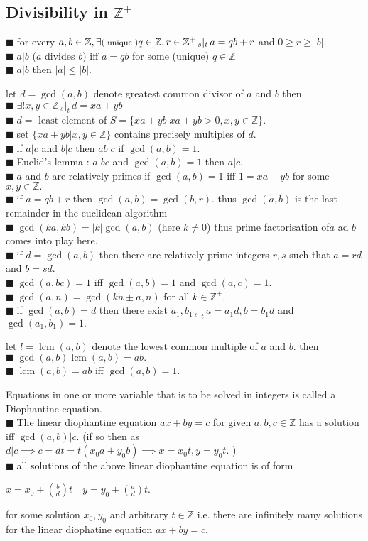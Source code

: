 \documentclass[11pt]{extarticle}
\newcommand{\Z}{\mathbb{Z}}
\newcommand{\snote}[1]{{\footnotesize(#1)}}
\newcommand{\st}{\,{}_{s}|_t\,}
\newcommand{\tbx}[2][]{
\begin{tcolorbox}[enhanced,breakable,size=small,colback=black!2!white,title={#1},arc is angular, arc=1.5mm,
	drop fuzzy shadow]
	#2
\end{tcolorbox}
}
\newcommand{\y}{$\blacksquare\;$}
\DeclareMathOperator{\lcm}{lcm}
\begin{document}
\begin{multicols}{2}
\section{Divisibility in $ \Z^+ $}
\tbx{ \y  for every $ a,b\in \Z, \exists \text{\snote{ unique }}q\in \Z, r\in \Z^+ \st a=qb+r$  and $ 0\geq r\geq |b|. $ \\
\y $ a|b $ \snote{$ a $ divides $ b $} iff $ a=qb $ for some \snote{unique} $ q\in \Z $ \\
\y $ a|b $ then $ |a| \leq |b|.$ }
\tbx{let $d= \gcd(a,b) $ denote greatest common divisor of $ a $ and $ b $ then\\
\y $ \exists! x,y\in \Z\st d=xa+yb$ \\
\y $ d=\text{ least element of } S=\{xa+yb|xa+yb>0,x,y\in \Z\} $. \\
\y set $ \{xa+yb|x,y\in \Z\} $ contains precisely multiples of $ d .$\\ 
\y if $ a|c $ and $ b|c $ then $ ab|c $ if $ \gcd(a,b)=1 $.\\
\y Euclid's lemma : $ a|bc $ and $ \gcd(a,b)=1 $ then $ a|c .$\\
\y $ a $ and $ b $ are relatively primes if $ \gcd(a,b)=1 $ iff $ 1=xa+yb $ for some $ x,y\in \Z. $ \\
\y if $ a=qb+r  $ then $ \gcd(a,b)=\gcd(b,r) .$ thus $ \gcd(a,b) $ is the last remainder in the euclidean algorithm\\
\y $ \gcd(ka,kb)=|k|\gcd(a,b) $ \snote{here $ k\neq0 $} thus prime factorisation of$ a $ ad $ b $ comes into play here.\\
\y if $ d=\gcd(a,b) $ then there are relatively prime integers $ r,s $ such that $ a=rd $ and $ b=sd. $ \\
\y $ \gcd(a,bc)=1 $ iff $ \gcd(a,b) =1$ and $ \gcd(a,c) =1.$ \\
\y $ \gcd(a,n)= \gcd(kn\pm a, n)$ for all $ k\in \Z^+ .$ \\
\y if $ \gcd(a,b)=d $ then there exist $ a_1,b_1\st a=a_1d,b=b_1d $ and $ \gcd(a_1,b_1)=1. $}
\tbx{ let $ l= \lcm(a,b)$ denote the lowest common multiple of $ a $ and $ b. $ then\\
 \y $ \gcd(a,b)\lcm(a,b)=ab. $ \\
 \y $ \lcm(a,b)=ab $ iff $ \gcd(a,b)=1. $  }
\tbx[ Diophantine equations]{  Equations in one or more variable that is to be solved in integers is called a Diophantine equation.\\
\y The linear diophantine equation $ ax+by=c $ for given $ a,b,c\in \Z $ has a solution iff $ \gcd(a,b)|c .$
\snote{if so then as $ d|c\implies c=dt=t(x_0a+y_0b )\implies x=x_0t,y=y_0t.$ }\\
\y all solutions of the above linear diophantine equation is of form
\begin{center}
	$ x=x_0+\left(\frac{ b }{d} \right)t \quad y=y_0+\left(\frac{ a }{d} \right) t.$
	\end{center} for some solution $ x_0,y_0 $ and arbitrary $ t\in \Z$ i.e. there are infinitely many solutions for the linear diophatine equation $ ax+by=c. $ }


\end{multicols}
\end{document}
